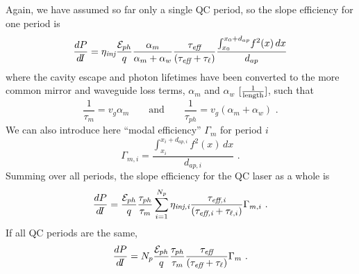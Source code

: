 \documentclass[12pt]{report}
\begin{document}
\bigskip
\noindent
Again, we have assumed so far only a single QC period, so the slope efficiency for one period is
\begin{equation}
\frac{d P}{d\!I} = \eta_\textit{inj}  \frac{\EE_{ph}}{q} \frac{\alpha_m}{\alpha_m+\alpha_w}  \frac{\tau_\textit{eff}}{\left(\tau_\textit{eff}+\tau_{\ell}\right)} \frac{\int_{x_0}^{x_0+d_{ap}} \! f^2(x) \, dx}{d_{ap}}
\end{equation}
where the cavity escape and photon lifetimes have been converted to the more common mirror and waveguide loss terms, $\alpha_m$ and $\alpha_w$ $[\frac{1}{\textnormal{length}}]$, such that
\begin{equation}
\frac{1}{\tau_m}=v_g \alpha_m \qquad \text{and} \qquad \frac{1}{\tau_{ph}}=v_g (\alpha_m + \alpha_w) \text{~.}
\end{equation}
We can also introduce here ``modal efficiency'' $\Gamma_m$ for period $i$
\begin{equation}
\Gamma_{m,i} = \frac{\int_{x_i}^{x_i+d_{ap,i}} \! f^2(x) \, dx}{d_{ap,i}} \text{~.}
\end{equation}
Summing over all periods, the slope efficiency for the QC laser as a whole is 
\begin{equation}
\frac{d P}{d\!I} = \frac{\EE_{ph}}{q} \frac{\tau_{ph}}{\tau_m} \sum_{i=1}^{N_p} \eta_\textit{inj,i} \frac{\tau_\textit{eff,i}}{\left(\tau_\textit{eff,i}+\tau_{\ell,i}\right)} \Gamma_{m,i} \text{~.}
\end{equation}
If all QC periods are the same,
\begin{equation}
\frac{d P}{d\!I} = N_p \frac{\EE_{ph}}{q} \frac{\tau_{ph}}{\tau_m} \frac{\tau_\textit{eff}}{\left(\tau_\textit{eff}+\tau_{\ell}\right)} \Gamma_{m} \text{~.}
\end{equation}



%
%
\end{document}
